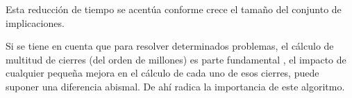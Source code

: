 Esta reducci\'on de tiempo se acent\'ua conforme crece el tama\~no del conjunto de implicaciones.

Si se tiene en cuenta que para resolver determinados problemas, el c\'alculo de multitud de cierres (del orden de millones) es parte fundamental \cite{Adaricheva}, el impacto de cualquier peque\~na mejora en el c\'alculo de cada uno de esos cierres, puede suponer una diferencia abismal. De ah\'i radica la importancia de este algoritmo.

